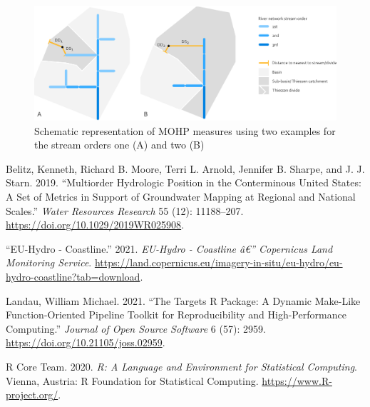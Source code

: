 \documentclass[fleqn,10pt]{wlscirep}
\newlength{\cslhangindent}
\newenvironment{CSLReferences}%
{\setlength{\parindent}{0pt}%
\everypar{\setlength{\hangindent}{\cslhangindent}}\ignorespaces}%
{\par}
\begin{document}
\begin{figure}[H]

{\centering \includegraphics[width=0.8\linewidth]{diagramms/mohp_scheme} 

}

\caption{Schematic representation of MOHP measures using two examples for the stream orders one (A) and two (B)}\label{fig:Schematicmohp}
\end{figure}

\hypertarget{refs}{}
\begin{CSLReferences}{1}{0}
\leavevmode\hypertarget{ref-belitz_multiorder_2019}{}%
Belitz, Kenneth, Richard B. Moore, Terri L. Arnold, Jennifer B. Sharpe, and J. J. Starn. 2019. {``Multiorder {Hydrologic} {Position} in the {Conterminous} {United} {States}: {A} {Set} of {Metrics} in {Support} of {Groundwater} {Mapping} at {Regional} and {National} {Scales}.''} \emph{Water Resources Research} 55 (12): 11188--207. \url{https://doi.org/10.1029/2019WR025908}.

\leavevmode\hypertarget{ref-noauthor_eu-hydro_2021}{}%
{``{EU}-{Hydro} - {Coastline}.''} 2021. \emph{EU-Hydro - Coastline â€'' Copernicus Land Monitoring Service}. \url{https://land.copernicus.eu/imagery-in-situ/eu-hydro/eu-hydro-coastline?tab=download}.

\leavevmode\hypertarget{ref-landau_targets_2021}{}%
Landau, William Michael. 2021. {``The Targets {R} Package: A Dynamic {Make}-Like Function-Oriented Pipeline Toolkit for Reproducibility and High-Performance Computing.''} \emph{Journal of Open Source Software} 6 (57): 2959. \url{https://doi.org/10.21105/joss.02959}.

\leavevmode\hypertarget{ref-r_core_team_r_2020}{}%
R Core Team. 2020. \emph{R: {A} {Language} and {Environment} for {Statistical} {Computing}}. Vienna, Austria: R Foundation for Statistical Computing. \url{https://www.R-project.org/}.

\end{CSLReferences}

\nocite{*}

\end{document}
